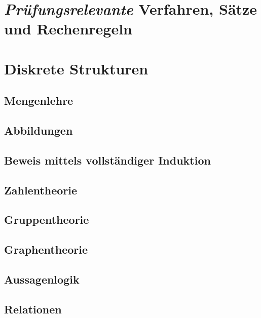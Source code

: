 \documentclass[10pt,a4paper]{article}
\begin{document}
\section*{\textit{Prüfungsrelevante} Verfahren, Sätze und Rechenregeln}
\section{Diskrete Strukturen}



\subsection{Mengenlehre}



\subsection{Abbildungen}



\subsection{Beweis mittels vollständiger Induktion}



\subsection{Zahlentheorie}



\subsection{Gruppentheorie}



\subsection{Graphentheorie}




\subsection{Aussagenlogik}



\subsection{Relationen}
\end{document}
